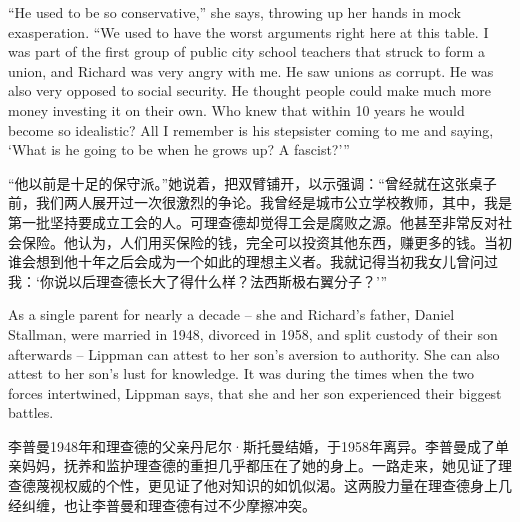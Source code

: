 \ifdefined\eng
``He used to be so conservative,'' she says, throwing up her hands in mock exasperation. ``We used to have the worst arguments right here at this table. I was part of the first group of public city school teachers that struck to form a union, and Richard was very angry with me. He saw unions as corrupt. He was also very opposed to social security. He thought people could make much more money investing it on their own. Who knew that within 10 years he would become so idealistic? All I remember is his stepsister coming to me and saying, `What is he going to be when he grows up? A fascist?'\hspace{0.01in}''
\fi

\ifdefined\chs
“他以前是十足的保守派。”她说着，把双臂铺开，以示强调：“曾经就在这张桌子前，我们两人展开过一次很激烈的争论。我曾经是城市公立学校教师，其中，我是第一批坚持要成立工会的人。可理查德却觉得工会是腐败之源。他甚至非常反对社会保险。他认为，人们用买保险的钱，完全可以投资其他东西，赚更多的钱。当初谁会想到他十年之后会成为一个如此的理想主义者。我就记得当初我女儿曾问过我：‘你说以后理查德长大了得什么样？法西斯极右翼分子？’”
\fi

\ifdefined\eng
As a single parent for nearly a decade -- she and Richard's father, Daniel Stallman, were married in 1948, divorced in 1958, and split custody of their son afterwards -- Lippman can attest to her son's aversion to authority. She can also attest to her son's lust for knowledge. It was during the times when the two forces intertwined, Lippman says, that she and her son experienced their biggest battles.
\fi

\ifdefined\chs
李普曼1948年和理查德的父亲丹尼尔·斯托曼结婚，于1958年离异。李普曼成了单亲妈妈，抚养和监护理查德的重担几乎都压在了她的身上。一路走来，她见证了理查德蔑视权威的个性，更见证了他对知识的如饥似渴。这两股力量在理查德身上几经纠缠，也让李普曼和理查德有过不少摩擦冲突。
\fi

